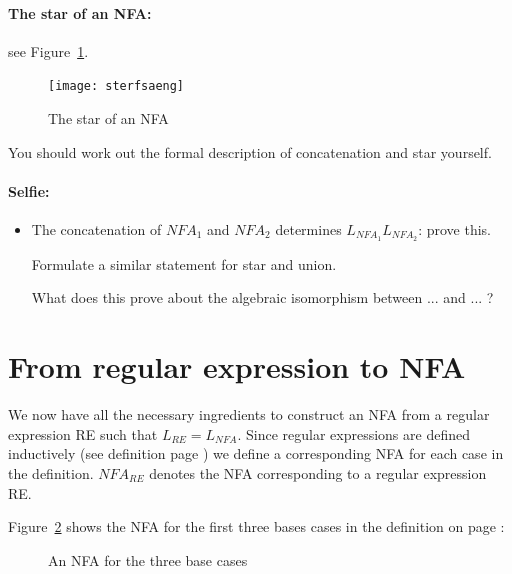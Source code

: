 \clearpage
\paragraph{The star of an NFA:} see Figure~\ref{starfsa}.

\begin{figure}[h]
\begin{center}\texttt{[image: sterfsaeng]}\end{center}
\caption{The star of an NFA\label{starfsa}}
\end{figure}

You should work out the formal description of concatenation and star
yourself.

\paragraph{Selfie:}
\begin{itemize}
\item[]
The concatenation of $NFA_1$ and $NFA_2$ determines
$L_{NFA_1}L_{NFA_2}$: prove this.

Formulate a similar statement for star and union.

What does this prove about the algebraic isomorphism between ... and ... ?

\end{itemize}

\clearpage

\section{From regular expression to NFA}\label{re2fsasec}

We now have all the necessary ingredients to construct an NFA from a regular
expression RE such that $L_{RE} = L_{NFA}$. Since regular
expressions are defined inductively (see definition page
\pageref{defregexp}) we define a corresponding NFA for each case in the
definition. $NFA_{RE}$ denotes the NFA corresponding to a
regular expression RE.

Figure~\ref{re2fsa} shows the NFA for the first three bases cases in
the definition on page \pageref{defregexp}:

\begin{figure}[h]
\caption{An NFA for the three base cases\label{re2fsa}}
\end{figure}

